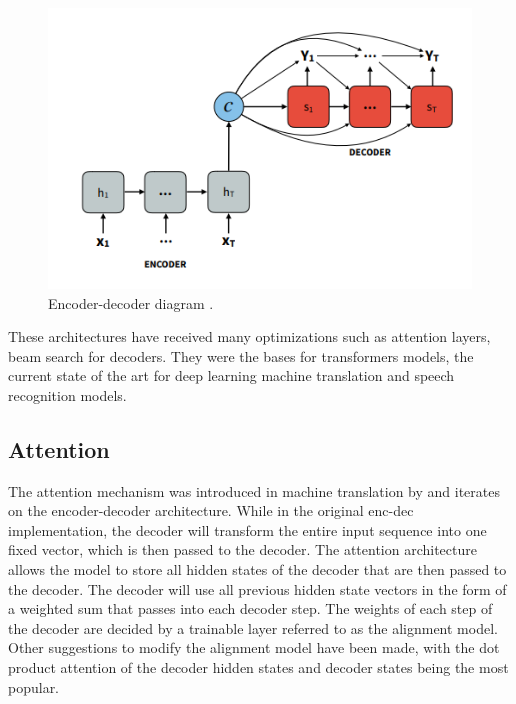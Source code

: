 \documentclass{kththesis}
\begin{document}
\begin{figure}[H]
    \centering
    \includegraphics[scale=0.6]{encoder.PNG}
    \caption{Encoder-decoder diagram \cite{attentionplots}.}
\end{figure}

These architectures have received many optimizations such as attention layers, beam search for decoders. They were the bases for transformers models, the current state of the art for deep learning machine translation and speech recognition models.

\subsection{Attention}
The attention mechanism was introduced in machine translation by \cite{attention} and iterates on the encoder-decoder architecture. While in the original enc-dec implementation, the decoder will transform the entire input sequence into one fixed vector, which is then passed to the decoder. The attention architecture allows the model to store all hidden states of the decoder that are then passed to the decoder. The decoder will use all previous hidden state vectors in the form of a weighted sum that passes into each decoder step. The weights of each step of the decoder are decided by a trainable layer referred to as the alignment model. Other suggestions to modify the alignment model have been made, with the dot product attention of the decoder hidden states and decoder states being the most popular.
\end{document}
